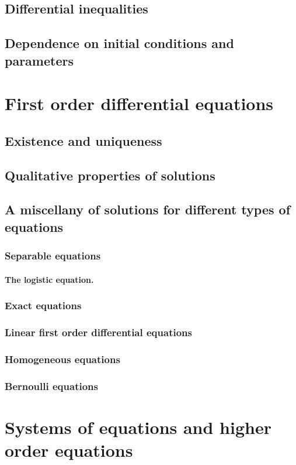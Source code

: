 \subsection{Differential inequalities}
\subsection{Dependence on initial conditions and parameters}

\section{First order differential equations}
\subsection{Existence and uniqueness}
\subsection{Qualitative properties of solutions}
\subsection{A miscellany of solutions for different types of equations}
\subsubsection{Separable equations}
\paragraph{The logistic equation.}
\subsubsection{Exact equations}
\subsubsection{Linear first order differential equations}
\subsubsection{Homogeneous equations}
\subsubsection{Bernoulli equations}

\section{Systems of equations and higher order equations}
